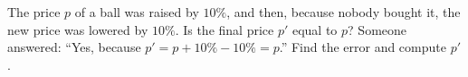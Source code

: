 The price $p$ of a ball was raised by $10\%$, and then, because nobody bought it, the new price was lowered by $10\%$. Is the final price $p'$ equal to $p$? Someone answered: ``Yes, because $p'=p+10\%-10\%=p$.'' Find the error and compute $p'$.

